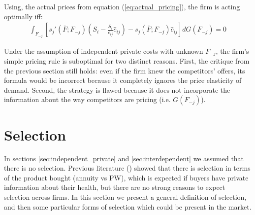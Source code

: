 \documentclass[12pt]{article}
\theoremstyle{plain}
\theoremstyle{plain}
\begin{document}
Using, the actual prices from equation (\ref{eq:actual_pricing}), the firm is acting optimally iff: 
\begin{align}\label{eq:comparison2}
    \int_{F_{-j}} \left[s_j'(\bar{F}; F_{-j}) \left(S_{i}-\frac{S_{i}}{\bar{c}_{ij}}\hat{c}_{ij}\right)- s_j(\bar{F}; F_{-j}) \hat{c}_{ij}  \right]dG(F_{-j})=0
\end{align}   
 
 
Under the assumption of independent private  costs with unknown $F_{-j}$, the firm's simple pricing rule is suboptimal for two distinct reasons. First, the critique from the previous section still holds: even if the firm knew the competitors' offers, its formula would be incorrect because it completely ignores the price elasticity of demand. Second, the strategy is flawed because it does not incorporate the information about the way competitors are pricing (i.e. $G(F_{-j})$). 



 

\newpage 


\section{Selection}

In sections \ref{sec:independent_private} and \ref{sec:interdependent} we assumed that there is no selection. Previous literature (\cite{illanes_retirement_2019}) showed that there is selection in terms of the product bought (annuity vs  PW), which is expected if buyers have private information about their health, but there are no strong reasons to expect selection across firms. In this section we present a general definition of selection, and then some particular forms of selection which could be present in the market. 
\end{document}
